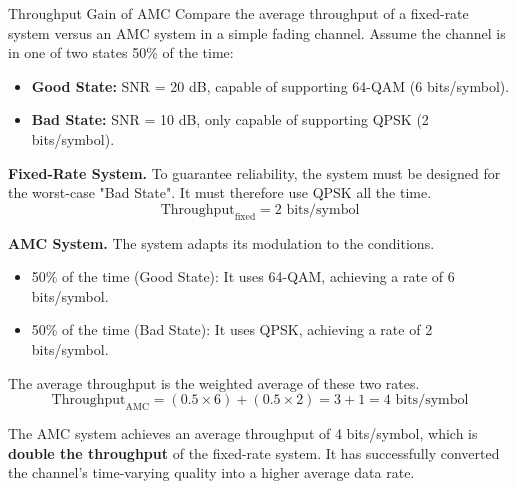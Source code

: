 \begin{workedexample}{Throughput Gain of AMC}
     Compare the average throughput of a fixed-rate system versus an AMC system in a simple fading channel.
    Assume the channel is in one of two states 50\% of the time:
    \begin{itemize}
        \item \textbf{Good State:} SNR = 20 dB, capable of supporting 64-QAM (6 bits/symbol).
        \item \textbf{Bad State:} SNR = 10 dB, only capable of supporting QPSK (2 bits/symbol).
    \end{itemize}
    
    \begin{derivationsteps}
        \step \textbf{Fixed-Rate System.} To guarantee reliability, the system must be designed for the worst-case "Bad State". It must therefore use QPSK all the time.
        \[ \text{Throughput}_{\text{fixed}} = 2 \text{ bits/symbol} \]
        
        \step \textbf{AMC System.} The system adapts its modulation to the conditions.
        \begin{itemize}
            \item 50\% of the time (Good State): It uses 64-QAM, achieving a rate of 6 bits/symbol.
            \item 50\% of the time (Bad State): It uses QPSK, achieving a rate of 2 bits/symbol.
        \end{itemize}
        The average throughput is the weighted average of these two rates.
        \[ \text{Throughput}_{\text{AMC}} = (0.5 \times 6) + (0.5 \times 2) = 3 + 1 = 4 \text{ bits/symbol} \]
    \end{derivationsteps}
    
     The AMC system achieves an average throughput of 4 bits/symbol, which is \textbf{double the throughput} of the fixed-rate system. It has successfully converted the channel's time-varying quality into a higher average data rate.
\end{workedexample}


